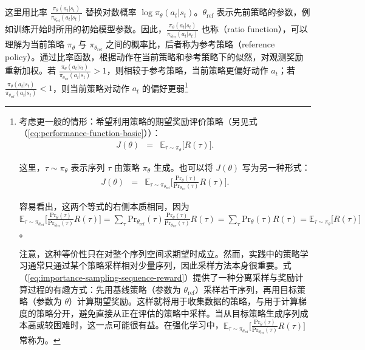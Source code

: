 \noindent 这里用比率 $\frac{\pi_{\theta}(a_t|s_t)}{\pi_{\theta_{\mathrm{ref}}}(a_t|s_t)}$ 替换对数概率 $\log \pi_{\theta}(a_t|s_t)$。$\theta_{\mathrm{ref}}$ 表示先前策略的参数，例如训练开始时所用的初始模型参数。因此，$\frac{\pi_{\theta}(a_t|s_t)}{\pi_{\theta_{\mathrm{ref}}}(a_t|s_t)}$ 也称（ratio function），可以理解为当前策略 $\pi_{\theta}$ 与 $\pi_{\theta_{\mathrm{ref}}}$ 之间的概率比，后者称为参考策略（reference policy）。通过比率函数，根据动作在当前策略和参考策略下的似然，对观测奖励重新加权。若 $\frac{\pi_{\theta}(a_t|s_t)}{\pi_{\theta_{\mathrm{ref}}}(a_t|s_t)} > 1$，则相较于参考策略，当前策略更偏好动作 $a_t$；若 $\frac{\pi_{\theta}(a_t|s_t)}{\pi_{\theta_{\mathrm{ref}}}(a_t|s_t)} < 1$，则当前策略对动作 $a_t$ 的偏好更弱\footnote{
考虑更一般的情形：希望利用策略的期望奖励评价策略（另见式（\ref{eq:performance-function-basic}））：
\begin{eqnarray}
J(\theta) & = & \mathbb{E}_{\tau \sim \pi_{\theta}} \Big[ R(\tau) \Big].
\end{eqnarray}

\noindent 这里，$\tau \sim \pi_{\theta}$ 表示序列 $\tau$ 由策略 $\pi_{\theta}$ 生成。也可以将 $J(\theta)$ 写为另一种形式：
\begin{eqnarray}
J(\theta) & = & \mathbb{E}_{\tau \sim \pi_{\theta_{\mathrm{ref}}}} \Big[ \frac{\mathrm{Pr}_{\theta}(\tau)}{\mathrm{Pr}_{\theta_{\mathrm{ref}}}(\tau)} R(\tau) \Big]. \label{eq:importance-sampling-sequence-reward}
\end{eqnarray}

容易看出，这两个等式的右侧本质相同，因为 $\mathbb{E}_{\tau \sim \pi_{\theta_{\mathrm{ref}}}} \Big[ \frac{\mathrm{Pr}_{\theta}(\tau)}{\mathrm{Pr}_{\theta_{\mathrm{ref}}}(\tau)} R(\tau) \Big] = \sum_{\tau} \mathrm{Pr}_{\theta_{\mathrm{ref}}}(\tau) \frac{\mathrm{Pr}_{\theta}(\tau)}{\mathrm{Pr}_{\theta_{\mathrm{ref}}}(\tau)} R(\tau) = \sum_{\tau} \mathrm{Pr}_{\theta}(\tau) R(\tau) = \mathbb{E}_{\tau \sim \pi_{\theta}} \Big[ R(\tau) \Big]$。

注意，这种等价性只在对整个序列空间求期望时成立。然而，实践中的策略学习通常只通过某个策略采样相对少量序列，因此采样方法本身很重要。式（\ref{eq:importance-sampling-sequence-reward}）提供了一种分离采样与奖励计算过程的有趣方式：先用基线策略（参数为 $\theta_{\mathrm{ref}}$）采样若干序列，再用目标策略（参数为 $\theta$）计算期望奖励。这样就将用于收集数据的策略，与用于计算梯度的策略分开，避免直接从正在评估的策略中采样。当从目标策略生成序列成本高或较困难时，这一点可能很有益。在强化学习中，$\mathbb{E}_{\tau \sim \pi_{\theta_{\mathrm{ref}}}} \Big[ \frac{\mathrm{Pr}_{\theta}(\tau)}{\mathrm{Pr}_{\theta_{\mathrm{ref}}}(\tau)} R(\tau) \Big]$ 常称为。

}
